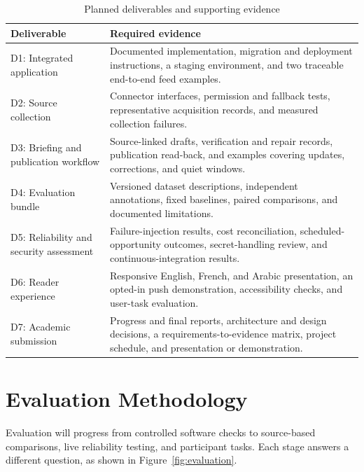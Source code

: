 \begin{table}[htbp]
\small
\centering
\caption{Planned deliverables and supporting evidence}
\label{tab:deliverables}
\begin{tabularx}{\linewidth}{p{3cm}X}
\toprule
Deliverable & Required evidence \\
\midrule

D1: Integrated application
& Documented implementation, migration and deployment instructions, a staging environment, and two traceable end-to-end feed examples. \\

D2: Source collection
& Connector interfaces, permission and fallback tests, representative acquisition records, and measured collection failures. \\

D3: Briefing and publication workflow
& Source-linked drafts, verification and repair records, publication read-back, and examples covering updates, corrections, and quiet windows. \\

D4: Evaluation bundle
& Versioned dataset descriptions, independent annotations, fixed baselines, paired comparisons, and documented limitations. \\

D5: Reliability and security assessment
& Failure-injection results, cost reconciliation, scheduled-opportunity outcomes, secret-handling review, and continuous-integration results. \\

D6: Reader experience
& Responsive English, French, and Arabic presentation, an opted-in push demonstration, accessibility checks, and user-task evaluation. \\

D7: Academic submission
& Progress and final reports, architecture and design decisions, a requirements-to-evidence matrix, project schedule, and presentation or demonstration. \\

\bottomrule
\end{tabularx}
\end{table}

\section{Evaluation Methodology}

Evaluation will progress from controlled software checks to source-based comparisons, live reliability testing, and participant tasks. Each stage answers a different question, as shown in Figure~\ref{fig:evaluation}.

